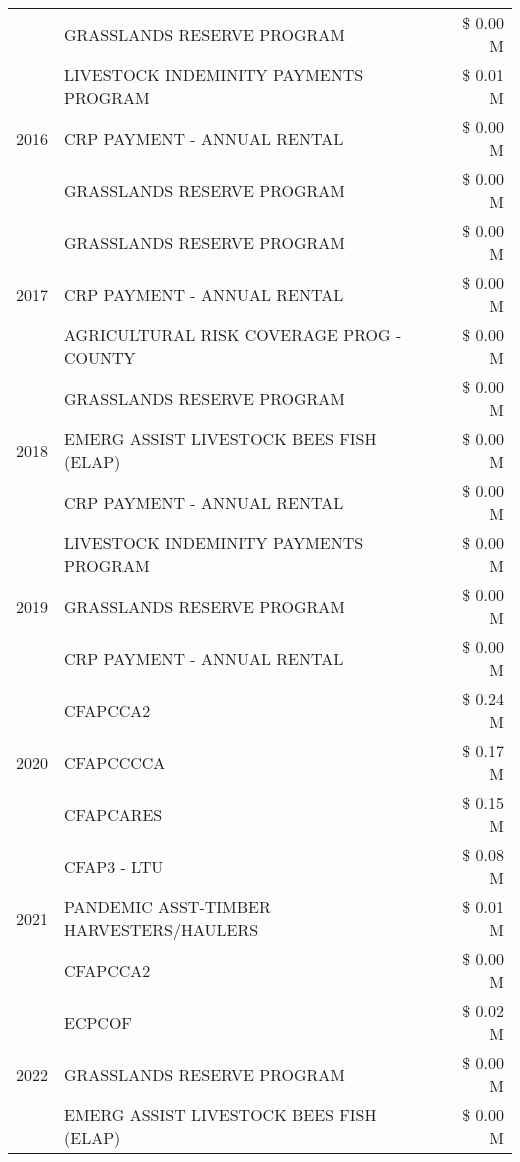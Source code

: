 \begin{tabular}{llr}
 & GRASSLANDS RESERVE PROGRAM & \$ 0.00 M \\
\cline{1-3}
\multirow[t]{3}{*}{2016} & LIVESTOCK INDEMINITY PAYMENTS PROGRAM & \$ 0.01 M \\
 & CRP PAYMENT - ANNUAL RENTAL & \$ 0.00 M \\
 & GRASSLANDS RESERVE PROGRAM & \$ 0.00 M \\
\cline{1-3}
\multirow[t]{3}{*}{2017} & GRASSLANDS RESERVE PROGRAM & \$ 0.00 M \\
 & CRP PAYMENT - ANNUAL RENTAL & \$ 0.00 M \\
 & AGRICULTURAL RISK COVERAGE PROG - COUNTY & \$ 0.00 M \\
\cline{1-3}
\multirow[t]{3}{*}{2018} & GRASSLANDS RESERVE PROGRAM & \$ 0.00 M \\
 & EMERG ASSIST LIVESTOCK BEES FISH (ELAP) & \$ 0.00 M \\
 & CRP PAYMENT - ANNUAL RENTAL & \$ 0.00 M \\
\cline{1-3}
\multirow[t]{3}{*}{2019} & LIVESTOCK INDEMINITY PAYMENTS PROGRAM & \$ 0.00 M \\
 & GRASSLANDS RESERVE PROGRAM & \$ 0.00 M \\
 & CRP PAYMENT - ANNUAL RENTAL & \$ 0.00 M \\
\cline{1-3}
\multirow[t]{3}{*}{2020} & CFAPCCA2 & \$ 0.24 M \\
 & CFAPCCCCA & \$ 0.17 M \\
 & CFAPCARES & \$ 0.15 M \\
\cline{1-3}
\multirow[t]{3}{*}{2021} & CFAP3 - LTU & \$ 0.08 M \\
 & PANDEMIC ASST-TIMBER HARVESTERS/HAULERS & \$ 0.01 M \\
 & CFAPCCA2 & \$ 0.00 M \\
\cline{1-3}
\multirow[t]{3}{*}{2022} & ECPCOF & \$ 0.02 M \\
 & GRASSLANDS RESERVE PROGRAM & \$ 0.00 M \\
 & EMERG ASSIST LIVESTOCK BEES FISH (ELAP) & \$ 0.00 M \\
\cline{1-3}
\bottomrule
\end{tabular}

